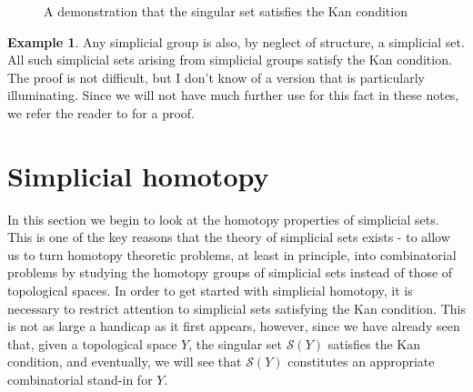 \documentclass[12pt]{article}
\theoremstyle{plain}
\theoremstyle{definition}
\newtheorem{example}[theorem]{Example}
\newcommand{\ms}[1]{\mathscr{#1}}
\begin{document}
\begin{figure}[!htp]
\begin{center}
\end{center}
\caption{A demonstration that the singular set satisfies the Kan condition}\label{F: fig19}
\end{figure}
\begin{example}
Any simplicial group is also, by neglect of structure, a simplicial set. All such simplicial sets arising from simplicial  groups satisfy the Kan condition. The proof is not difficult, but I don't know of a version that is particularly illuminating. Since we will not have much further use for this fact in these notes, we refer the reader to \cite[Theorem 2.2]{MOORE} for a proof. 
\end{example}












\section{Simplicial homotopy}\label{S: simp homotopy}

In this section we begin to look at the homotopy properties of simplicial sets. This is one of the key reasons that the theory of simplicial sets exists - to allow us to turn homotopy theoretic problems, at least in principle, into combinatorial problems by studying the homotopy groups of simplicial sets instead of those of topological spaces. In order to get started with simplicial homotopy, it is necessary to restrict attention to simplicial sets satisfying the Kan condition. This is not as large a handicap as it first appears, however, since we have already seen that, given a topological space $Y$, the singular set $\ms S(Y)$ satisfies the Kan condition, and eventually, we will see that $\ms S(Y)$  constitutes an appropriate combinatorial stand-in for $Y$. 
\end{document}
